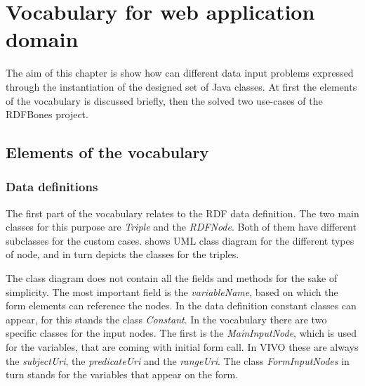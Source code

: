 \chapter{Vocabulary for web application domain}

The aim of this chapter is show how can different data input problems expressed through the instantiation of the designed set of Java classes. At first the elements of the vocabulary is discussed briefly, then the solved two use-cases of the RDFBones project. 

\section{Elements of the vocabulary}

\subsection{Data definitions}

The first part of the vocabulary relates to the RDF data definition. The two main classes for this purpose are \textit{Triple} and the \textit{RDFNode}. Both of them have different subclasses for the custom cases.  shows UML class diagram for the different types of node, and  in turn depicts the classes for the triples.


The class diagram does not contain all the fields and methods for the sake of simplicity. The most important field is the \textit{variableName}, based on which the form elements can reference the nodes. In the data definition constant classes can appear, for this stands the class \textit{Constant}. In the vocabulary there are two specific classes for the input nodes. The first is the \textit{MainInputNode}, which is used for the variables, that are coming with initial form call. In VIVO these are always the \textit{subjectUri}, the \textit{predicateUri} and the \textit{rangeUri}. The class \textit{FormInputNodes} in turn stands for the variables that appear on the form.


